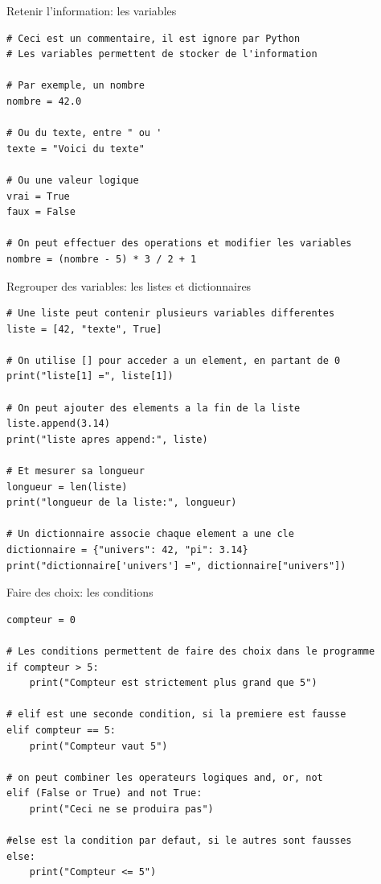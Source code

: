 \documentclass[
aspectratio=169 %
]{beamer}
\begin{document}
\begin{frame}[fragile]{Retenir l'information: les variables}
    \begin{lstlisting}
# Ceci est un commentaire, il est ignore par Python
# Les variables permettent de stocker de l'information

# Par exemple, un nombre
nombre = 42.0

# Ou du texte, entre " ou '
texte = "Voici du texte"

# Ou une valeur logique
vrai = True
faux = False

# On peut effectuer des operations et modifier les variables
nombre = (nombre - 5) * 3 / 2 + 1
\end{lstlisting}
\end{frame}

\begin{frame}[fragile]{Regrouper des variables: les listes et dictionnaires}
    \begin{lstlisting}
# Une liste peut contenir plusieurs variables differentes
liste = [42, "texte", True]

# On utilise [] pour acceder a un element, en partant de 0
print("liste[1] =", liste[1])

# On peut ajouter des elements a la fin de la liste
liste.append(3.14)
print("liste apres append:", liste)

# Et mesurer sa longueur
longueur = len(liste)
print("longueur de la liste:", longueur)

# Un dictionnaire associe chaque element a une cle
dictionnaire = {"univers": 42, "pi": 3.14}
print("dictionnaire['univers'] =", dictionnaire["univers"])
\end{lstlisting}
\end{frame}

\begin{frame}[fragile]{Faire des choix: les conditions}
    \begin{lstlisting}
compteur = 0 

# Les conditions permettent de faire des choix dans le programme
if compteur > 5:
    print("Compteur est strictement plus grand que 5")

# elif est une seconde condition, si la premiere est fausse
elif compteur == 5:
    print("Compteur vaut 5")

# on peut combiner les operateurs logiques and, or, not
elif (False or True) and not True:
    print("Ceci ne se produira pas")

#else est la condition par defaut, si le autres sont fausses
else:
    print("Compteur <= 5")
\end{lstlisting}
\end{frame}
\end{document}
